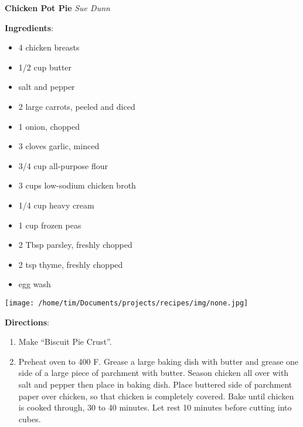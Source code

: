 \documentclass[11pt, twoside, openany]{book}
\begin{document}
\noindent\begin{minipage}[t]{\linewidth}%
{\Large\textbf{Chicken Pot Pie}} \label{chicken-pot-pie}\hfill\textit{Sue Dunn}\\
\noindent\begin{minipage}[t]{0.78\linewidth}%
\textbf{Ingredients}:\vspace{-3mm}
\begin{multicols}{2}
\begin{itemize}\setlength\itemsep{-1mm}
\item 4 chicken breasts
\item 1/2 cup butter
\item salt and pepper
\item 2 large carrots, peeled and diced
\item 1 onion, chopped
\item 3 cloves garlic, minced
\item 3/4 cup all-purpose flour
\item 3 cups low-sodium chicken broth
\item 1/4 cup heavy cream
\item 1 cup frozen peas
\item 2 Tbsp parsley, freshly chopped
\item 2 tsp thyme, freshly chopped
\item egg wash
\end{itemize}
\end{multicols}
\end{minipage}
\noindent\begin{minipage}[t]{0.18\linewidth}
\centering \strut\vspace*{-\baselineskip}\newline
\texttt{[image: /home/tim/Documents/projects/recipes/img/none.jpg]}\\
\end{minipage}\vspace{3mm}
\textbf{Directions}:
\vspace{-3mm}\begin{enumerate}\setlength\itemsep{-1mm}
\item Make ``Biscuit Pie Crust''.
\item Preheat oven to 400 F. Grease a large baking dish with butter and grease one side of a large piece of parchment with butter. Season chicken all over with salt and pepper then place in baking dish. Place buttered side of parchment paper over chicken, so that chicken is completely covered. Bake until chicken is cooked through, 30 to 40 minutes. Let rest 10 minutes before cutting into cubes.

\end{enumerate}
\end{minipage}
\end{document}
